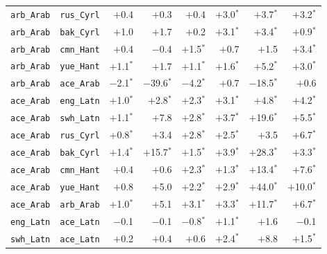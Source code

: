 \begin{longtable}{@{}ll rrr rrr@{}}
\texttt{arb\_Arab} & \texttt{rus\_Cyrl} & $+$0.4\phantom{$^{*}$} & $+$0.3\phantom{$^{*}$} & $+$0.4\phantom{$^{*}$} & $+$3.0$^{*}$ & $+$3.7$^{*}$ & $+$3.2$^{*}$ \\
\texttt{arb\_Arab} & \texttt{bak\_Cyrl} & $+$1.0\phantom{$^{*}$} & $+$1.7\phantom{$^{*}$} & $+$0.2\phantom{$^{*}$} & $+$3.1$^{*}$ & $+$3.4$^{*}$ & $+$0.9$^{*}$ \\
\texttt{arb\_Arab} & \texttt{cmn\_Hant} & $+$0.4\phantom{$^{*}$} & $-$0.4\phantom{$^{*}$} & $+$1.5$^{*}$ & $+$0.7\phantom{$^{*}$} & $+$1.5\phantom{$^{*}$} & $+$3.4$^{*}$ \\
\texttt{arb\_Arab} & \texttt{yue\_Hant} & $+$1.1$^{*}$ & $+$1.7\phantom{$^{*}$} & $+$1.1$^{*}$ & $+$1.6$^{*}$ & $+$5.2$^{*}$ & $+$3.0$^{*}$ \\
\texttt{arb\_Arab} & \texttt{ace\_Arab} & $-$2.1$^{*}$ & $-$39.6$^{*}$ & $-$4.2$^{*}$ & $+$0.7\phantom{$^{*}$} & $-$18.5$^{*}$ & $+$0.6\phantom{$^{*}$} \\
\addlinespace
\texttt{ace\_Arab} & \texttt{eng\_Latn} & $+$1.0$^{*}$ & $+$2.8$^{*}$ & $+$2.3$^{*}$ & $+$3.1$^{*}$ & $+$4.8$^{*}$ & $+$4.2$^{*}$ \\
\texttt{ace\_Arab} & \texttt{swh\_Latn} & $+$1.1$^{*}$ & $+$7.8\phantom{$^{*}$} & $+$2.8$^{*}$ & $+$3.7$^{*}$ & $+$19.6$^{*}$ & $+$5.5$^{*}$ \\
\texttt{ace\_Arab} & \texttt{rus\_Cyrl} & $+$0.8$^{*}$ & $+$3.4\phantom{$^{*}$} & $+$2.8$^{*}$ & $+$2.5$^{*}$ & $+$3.5\phantom{$^{*}$} & $+$6.7$^{*}$ \\
\texttt{ace\_Arab} & \texttt{bak\_Cyrl} & $+$1.4$^{*}$ & $+$15.7$^{*}$ & $+$1.5$^{*}$ & $+$3.9$^{*}$ & $+$28.3$^{*}$ & $+$3.3$^{*}$ \\
\texttt{ace\_Arab} & \texttt{cmn\_Hant} & $+$0.4\phantom{$^{*}$} & $+$0.6\phantom{$^{*}$} & $+$2.3$^{*}$ & $+$1.3$^{*}$ & $+$13.4$^{*}$ & $+$7.6$^{*}$ \\
\texttt{ace\_Arab} & \texttt{yue\_Hant} & $+$0.8\phantom{$^{*}$} & $+$5.0\phantom{$^{*}$} & $+$2.2$^{*}$ & $+$2.9$^{*}$ & $+$44.0$^{*}$ & $+$10.0$^{*}$ \\
\texttt{ace\_Arab} & \texttt{arb\_Arab} & $+$1.0$^{*}$ & $+$5.1\phantom{$^{*}$} & $+$3.1$^{*}$ & $+$3.3$^{*}$ & $+$11.7$^{*}$ & $+$6.7$^{*}$ \\
\midrule
\texttt{eng\_Latn} & \texttt{ace\_Latn} & $-$0.1\phantom{$^{*}$} & $-$0.1\phantom{$^{*}$} & $-$0.8$^{*}$ & $+$1.1$^{*}$ & $+$1.6\phantom{$^{*}$} & $-$0.1\phantom{$^{*}$} \\
\texttt{swh\_Latn} & \texttt{ace\_Latn} & $+$0.2\phantom{$^{*}$} & $+$0.4\phantom{$^{*}$} & $+$0.6\phantom{$^{*}$} & $+$2.4$^{*}$ & $+$8.8\phantom{$^{*}$} & $+$1.5$^{*}$ \\

\end{longtable}

